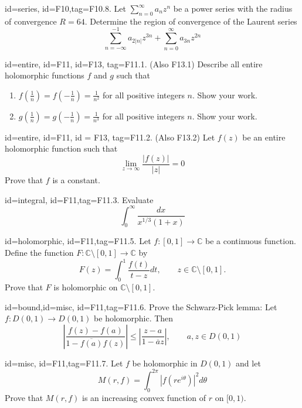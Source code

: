 \documentclass[12pt,letterpaper]{article}
\theoremstyle{plain}
\theoremstyle{definition}
\begin{document}
{\item[id=series, id=F10,tag=F10.8.]
Let $\sum_{n=0}^{\infty} a_n z^n$ be a power series with the radius of convergence $R = 64$. Determine the region of convergence of the Laurent series
\[
	\sum_{n=-\infty}^{-1} a_{2| n |} z^{3n} + \sum_{n=0}^{\infty} a_{3n} z^{2n}
\]

\item[id=entire, id=F11, id=F13, tag=F11.1.]
(Also F13.1) Describe all entire holomorphic functions $f$ and $g$ such that
\begin{enumerate}[label=(\alph*)]\onlyitems
\item $f\left(\frac{1}{n}\right) = f\left(-\frac{1}{n}\right) = \frac{1}{n^2}$ for all positive integers $n$. Show your work.
\item $g\left(\frac{1}{n}\right) = g\left(-\frac{1}{n}\right) = \frac{1}{n^3}$ for all positive integers $n$. Show your work.
\end{enumerate}

\item[id=entire, id=F11, id = F13, tag=F11.2.]
(Also F13.2) Let $f(z)$ be an entire holomorphic function such that
\[
	\lim_{z\rightarrow \infty} \frac{| f(z) |}{| z |} = 0
\]
Prove that $f$ is a constant.

\item[id=integral, id=F11,tag=F11.3.]
Evaluate
\[
	\int_{0}^{\infty} \frac{dx}{x^{1/3}(1+x)}
\]

\item[id=holomorphic, id=F11,tag=F11.5.]
Let $f : [0,1] \rightarrow \mathbb{C}$ be a continuous function. Define the function $F : \mathbb{C} \setminus [0,1] \rightarrow \mathbb{C}$ by
\[
	F(z) = \int_{0}^{1} \frac{f(t)}{t-z} dt, \qquad z \in \mathbb{C} \setminus [0,1].
\]
Prove that $F$ is holomorphic on $\mathbb{C} \setminus [0,1]$.

\item[id=bound,id=misc, id=F11,tag=F11.6.]
Prove the Schwarz-Pick lemma: Let $f : D(0,1) \rightarrow D(0,1)$ be holomorphic. Then
\[
	\left| \frac{f(z) - f(a)}{1 - \overline{f(a)}f(z)} \right| \le \left| \frac{z-a}{1 - \overline{a}z} \right|, \qquad a,z \in D(0,1)
\]

\item[id=misc, id=F11,tag=F11.7.]
Let $f$ be holomorphic in $D(0,1)$ and let
\[
	M(r,f) = \int_{0}^{2\pi} | f(re^{i\theta}) |^2 d\theta
\]
Prove that $M(r,f)$ is an increasing convex function of $r$ on $[0,1)$.

}
\end{document}
